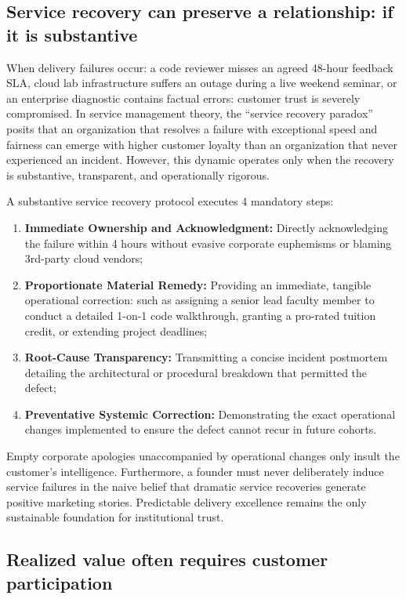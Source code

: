 \subsection{Service recovery can preserve a relationship: if it is substantive}

When delivery failures occur: a code reviewer misses an agreed 48-hour feedback SLA, cloud lab infrastructure suffers an outage during a live weekend seminar, or an enterprise diagnostic contains factual errors: customer trust is severely compromised. In service management theory, the ``service recovery paradox'' posits that an organization that resolves a failure with exceptional speed and fairness can emerge with higher customer loyalty than an organization that never experienced an incident. However, this dynamic operates only when the recovery is substantive, transparent, and operationally rigorous.

A substantive service recovery protocol executes 4 mandatory steps:
\begin{enumerate}
\item \textbf{Immediate Ownership and Acknowledgment:} Directly acknowledging the failure within 4 hours without evasive corporate euphemisms or blaming 3rd-party cloud vendors;
\item \textbf{Proportionate Material Remedy:} Providing an immediate, tangible operational correction: such as assigning a senior lead faculty member to conduct a detailed 1-on-1 code walkthrough, granting a pro-rated tuition credit, or extending project deadlines;
\item \textbf{Root-Cause Transparency:} Transmitting a concise incident postmortem detailing the architectural or procedural breakdown that permitted the defect;
\item \textbf{Preventative Systemic Correction:} Demonstrating the exact operational changes implemented to ensure the defect cannot recur in future cohorts.
\end{enumerate}
Empty corporate apologies unaccompanied by operational changes only insult the customer's intelligence. Furthermore, a founder must never deliberately induce service failures in the naive belief that dramatic service recoveries generate positive marketing stories. Predictable delivery excellence remains the only sustainable foundation for institutional trust.

\subsection{Realized value often requires customer participation}

